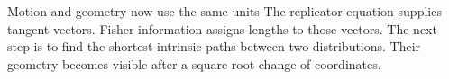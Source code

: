 \documentclass[aspectratio=169,11pt]{beamer}
\begin{document}
\begin{frame}{Motion and geometry now use the same units}
The replicator equation supplies tangent vectors.
\vspace{.5cm}
Fisher information assigns lengths to those vectors.
\vspace{.5cm}
The next step is to find the shortest intrinsic paths
between two distributions. Their geometry becomes visible
after a square-root change of coordinates.
\end{frame}
\end{document}
